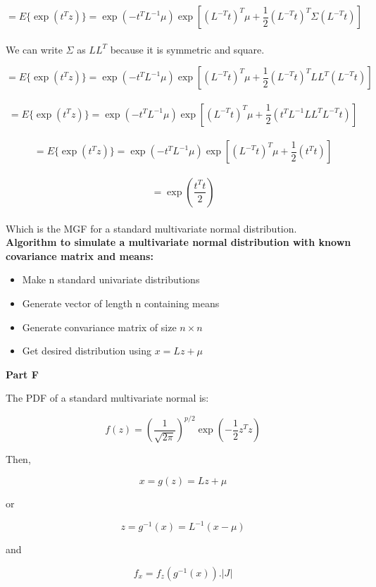 \documentclass[12pt]{amsart}
\begin{document}
$$ = E\{\exp(t^Tz)\}= \exp(-t^TL^{-1}\mu)\exp\left[ \left(L^{-T}t\right)^T\mu  + \frac{1}{2}\left(L^{-T}t\right)^T \Sigma \left(L^{-T}t\right) \right]$$\\


We can write $\Sigma$ as $LL^T$ because it is symmetric and square.

$$ = E\{\exp(t^Tz)\}= \exp\left(-t^TL^{-1}\mu\right)\exp\left[  (L^{-T}t)^T\mu  + \frac{1}{2}\left(L^{-T}t\right)^T LL^T\left(L^{-T}t\right) \right]$$\\

$$= E\{\exp(t^Tz)\}= \exp\left(-t^TL^{-1}\mu\right)\exp\left[  (L^{-T}t)^T\mu  + \frac{1}{2}\left(t^TL^{-1} LL^TL^{-T}t\right) \right]$$\\


$$ = E\{\exp(t^Tz)\}= \exp\left(-t^TL^{-1}\mu\right)\exp\left[  (L^{-T}t)^T\mu  + \frac{1}{2}\left(t^Tt\right) \right]$$\\

$$ =\exp\left(\frac{t^Tt}{2}\right)$$\\

Which is the MGF for a standard multivariate normal distribution.\\

{\bf Algorithm to simulate a multivariate normal distribution with known covariance matrix and means:}

\begin{itemize}
    \item Make n standard univariate distributions
    \item Generate vector of length n containing means
    \item Generate convariance matrix of size $n \times n$
    \item Get desired distribution using $x = Lz + \mu$
\end{itemize}
\bigskip
\bigskip
{\bf Part F}\\
\bigskip

The PDF of a standard multivariate normal is:



$$ f(z)=\left(\frac{1}{\sqrt{2\pi}} \right)^{p/2} \exp\left(-\frac{1}{2} z^Tz\right) $$

Then,

$$ x=g(z) = Lz+\mu$$

or

$$ z= g^{-1}(x) = L^{-1}(x - \mu)$$

and

$$f_x = f_z(g^{-1}(x)).|J| $$
\end{document}
